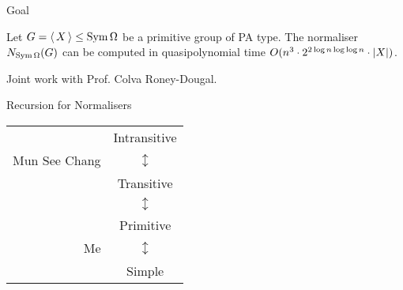 \begin{frame}{Goal}
    \begin{thm}
        Let $G =  \left\langle \, X \, \right\rangle  \leq \operatorname{Sym} \Omega$ be a primitive group
        of {\color{blue} PA type}.
        The normaliser
        $N_{\operatorname{Sym} \Omega}(G)$
        can be computed in {\color{blue} quasipolynomial} time
        $O(n ^ 3 \cdot 2 ^ {2 \log n \log \log n} \cdot  \left| X \right| )$.
    \end{thm}

    \vspace{1em}
    \pause
    Joint work with Prof. Colva Roney-Dougal.
\end{frame}

\begin{frame}{Recursion for Normalisers}
    \begin{center}
        \hspace{-5em}
        \begin{tabular}{r c}
            & Intransitive
            \\
            Mun See Chang & $\updownarrow$
            \\
            & Transitive
            \\
            & $\updownarrow$
            \\
            & Primitive
            \\
            Me & $\updownarrow$
            \\
            & Simple
        \end{tabular}
    \end{center}
\end{frame}
